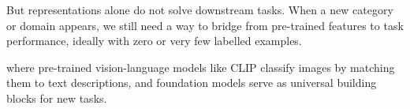\vspace{2.5em}


 But representations alone do not solve downstream tasks. When a new category or domain appears, we still need a way to bridge from pre-trained features to task performance, ideally with zero or very few labelled examples.

 where pre-trained vision-language models like CLIP classify images by matching them to text descriptions, and foundation models serve as universal building blocks for new tasks.

